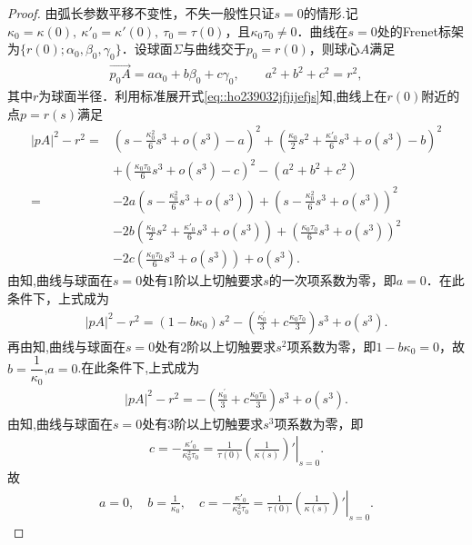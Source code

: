 \documentclass[../../main.tex]{subfiles}%
\begin{document}
\begin{proof}

由弧长参数平移不变性，不失一般性只证$s=0$的情形.记$\kappa_0=\kappa(0),\ \kappa'_0=\kappa'(0),\ \tau_0=\tau(0)$，且$\kappa_0\tau_0\neq0$．曲线在$s=0$处的Frenet标架为$\{r(0);\alpha_0,\beta_0,\gamma_0\}$．设球面$\Sigma$与曲线交于$p_0=r(0)$，则球心$A$满足
\begin{align*}
\overrightarrow{p_0A}=a\alpha_0+b\beta_0+c\gamma_0,\qquad a^2+b^2+c^2=r^2,
\end{align*}
其中$r$为球面半径．利用标准展开式\eqref{eq::ho239032jfjijefjs}知,曲线上在$r(0)$附近的点$p=r(s)$满足
\begin{align*}
|pA|^2-r^2=&\left(s-\frac{\kappa_0^2}{6}s^3+o(s^3)-a\right)^2+\left(\frac{\kappa_0}{2}s^2+\frac{\kappa'_0}{6}s^3+o(s^3)-b\right)^2\\
&+\left(\frac{\kappa_0\tau_0}{6}s^3+o(s^3)-c\right)^2-(a^2+b^2+c^2)\\
=&-2a\left(s-\frac{\kappa_0^2}{6}s^3+o(s^3)\right)+\left(s-\frac{\kappa_0^2}{6}s^3+o(s^3)\right)^2\\
&-2b\left(\frac{\kappa_0}{2}s^2+\frac{\kappa'_0}{6}s^3+o(s^3)\right)+\left(\frac{\kappa_0\tau_0}{6}s^3+o(s^3)\right)^2\\
&-2c\left(\frac{\kappa_0\tau_0}{6}s^3+o(s^3)\right)+o(s^3).
\end{align*}
由知,曲线与球面在$s=0$处有$1$阶以上切触要求$s$的一次项系数为零，即$a=0$．在此条件下，上式成为
\begin{align*}
|pA|^2-r^2=\left( 1-b\kappa _0 \right) s^2-\left( \frac{\kappa _{0}^{\prime}}{3}+c\frac{\kappa _0\tau _0}{3} \right) s^3+o\left( s^3 \right) .
\end{align*}
再由知,曲线与球面在$s=0$处有$2$阶以上切触要求$s^2$项系数为零，即$1-b\kappa_0=0$，故$b=\dfrac{1}{\kappa_0}$,$a=0$.在此条件下,上式成为
\begin{align*}
|pA|^2-r^2=-\left( \frac{\kappa _{0}^{\prime}}{3}+c\frac{\kappa _0\tau _0}{3} \right) s^3+o\left( s^3 \right) .
\end{align*}
由知,曲线与球面在$s=0$处有$3$阶以上切触要求$s^3$项系数为零，即
\begin{align*}
c=-\frac{\kappa'_0}{\kappa_0^2\tau_0}=\frac{1}{\tau \left( 0 \right)}\left.\left( \frac{1}{\kappa \left( s \right)} \right) ' \right|_{s=0}.
\end{align*}
故
\begin{align*}
a=0,\quad b=\frac{1}{\kappa_0},\quad c=-\frac{\kappa'_0}{\kappa_0^2\tau_0}=\frac{1}{\tau \left( 0 \right)}\left.\left( \frac{1}{\kappa \left( s \right)} \right) ' \right|_{s=0}.

\end{align*}
\end{proof}
\end{document}
